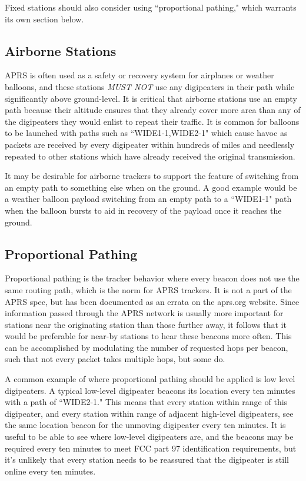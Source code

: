 Fixed stations should also consider using ``proportional pathing,"
which warrants its own section below.

\subsection{Airborne Stations}

APRS is often used as a safety or recovery system for airplanes or weather balloons,
and these stations \emph{MUST NOT} use any digipeaters in their path while
significantly above ground-level. \cite{nopathhigh}
It is critical that airborne stations use an empty path because their
altitude ensures that they already cover more area than any of the digipeaters
they would enlist to repeat their traffic.
It is common for balloons to be launched with paths such as ``WIDE1-1,WIDE2-1"
which cause havoc as packets are received by every digipeater within hundreds of
miles and needlessly repeated to other stations which have already received the
original transmission.

It may be desirable for airborne trackers to support the feature of switching from
an empty path to something else when on the ground.
A good example would be a weather balloon payload switching from an empty path
to a ``WIDE1-1" path when the balloon bursts to aid in recovery of the
payload once it reaches the ground.

\subsection{Proportional Pathing}

Proportional pathing is the tracker behavior where every beacon does not
use the same routing path, which is the norm for APRS trackers.
It is not a part of the APRS spec, but has been documented as an
errata on the aprs.org website. \cite{bobproppath}
Since information passed through the APRS network is usually more important
for stations near the originating station than those further away,
it follows that it would be preferable for near-by stations to hear these beacons
more often.
This can be accomplished by modulating the number of requested hops per beacon,
such that not every packet takes multiple hops, but some do.

A common example of where proportional pathing should be applied is
low level digipeaters.
A typical low-level digipeater beacons its location every ten minutes with
a path of ``WIDE2-1."
This means that every station within range of this digipeater, 
and every station within range of adjacent high-level digipeaters,
see the same location beacon for the unmoving digipeater every ten minutes.
It is useful to be able to see where low-level digipeaters are,
and the beacons may be required every ten minutes to meet FCC part 97 identification
requirements,
but it's unlikely that every station needs to be reassured that the digipeater
is still online every ten minutes.


